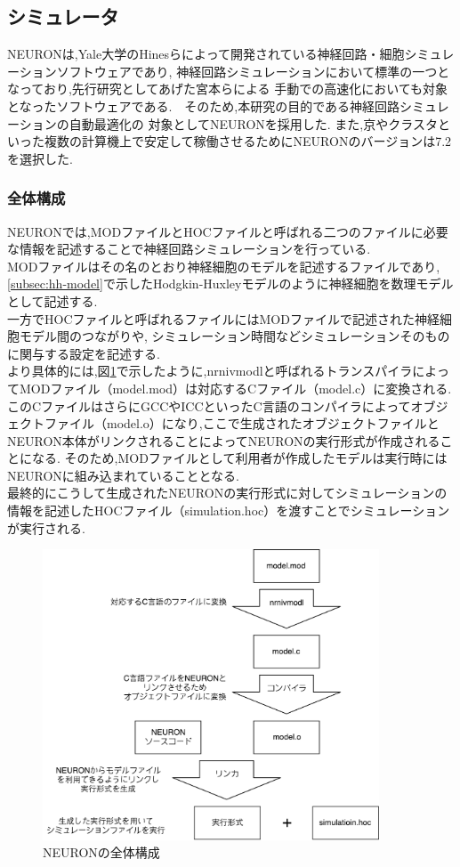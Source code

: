 \subsection{シミュレータ}
\label{subsec:neuron}
NEURONは,Yale大学のHinesらによって開発されている神経回路・細胞シミュレーションソフトウェアであり\cite{NEURON},
神経回路シミュレーションにおいて標準の一つとなっており,先行研究としてあげた宮本らによる
手動での高速化においても対象となったソフトウェアである.　そのため,本研究の目的である神経回路シミュレーションの自動最適化の
対象としてNEURONを採用した. また,京やクラスタといった複数の計算機上で安定して稼働させるためにNEURONのバージョンは7.2を選択した.\\

\subsubsection{全体構成}
NEURONでは,MODファイルとHOCファイルと呼ばれる二つのファイルに必要な情報を記述することで神経回路シミュレーションを行っている.\\
MODファイルはその名のとおり神経細胞のモデルを記述するファイルであり, \ref{subsec:hh-model}で示したHodgkin-Huxleyモデルのように神経細胞を数理モデルとして記述する.\\
一方でHOCファイルと呼ばれるファイルにはMODファイルで記述された神経細胞モデル間のつながりや,
シミュレーション時間などシミュレーションそのものに関与する設定を記述する.\\
より具体的には,図\ref{fig:neuron}で示したように,nrnivmodlと呼ばれるトランスパイラによってMODファイル（model.mod）は対応するCファイル（model.c）に変換される.
このCファイルはさらにGCCやICCといったC言語のコンパイラによってオブジェクトファイル（model.o）になり,ここで生成されたオブジェクトファイルと
NEURON本体がリンクされることによってNEURONの実行形式が作成されることになる.
そのため,MODファイルとして利用者が作成したモデルは実行時にはNEURONに組み込まれていることとなる.\\
最終的にこうして生成されたNEURONの実行形式に対してシミュレーションの情報を記述したHOCファイル（simulation.hoc）を渡すことでシミュレーションが実行される.\\
\clearpage
\begin{figure}[htb]
  \begin{center}
    \includegraphics[width=10cm]{./images/neuron}
    \caption{NEURONの全体構成}
    \label{fig:neuron}
  \end{center}
\end{figure}

